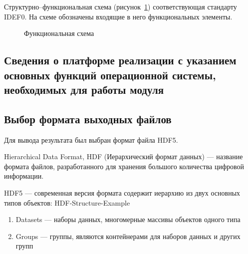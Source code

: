 Структурно--функциональная схема (рисунок~\ref{pic:idef0}) соответствующая стандарту IDEF0. На схеме обозначены входящие в него функциональных элементы. %

\begin{figure}[h!]
\caption{Функциональная схема}
\label{pic:idef0}
\end{figure}

\subsection{Сведения о платформе реализации с указанием основных функций операционной системы, необходимых для работы модуля}


\subsection {Выбор формата выходных файлов}
Для вывода результата был выбран формат файла HDF5. 

Hierarchical Data Format, HDF (Иерархический формат данных) — название формата файлов, разработанного для хранения большого количества цифровой информации.

HDF5 — современная версия формата содержит иерархию из двух основных типов объектов:
HDF-Structure-Example
\begin{enumerate}
\item Datasets — наборы данных, многомерные массивы объектов одного типа
\item Groups — группы, являются контейнерами для наборов данных и других групп
\end{enumerate}
    

